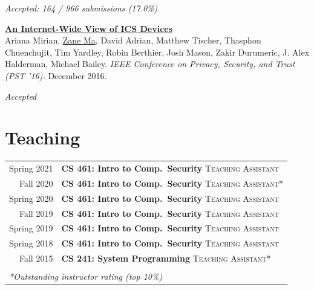 \documentclass[10pt,singlecolumn]{article} %
\begin{document}
{\raggedleft\textit{Accepted: 164 / 966 submissions (17.0\%)}\par}
\vspace{6pt}


\textbf{\href{https://zanema.com/papers/pst16_ics.pdf}{An Internet-Wide View of ICS Devices}}\\
Ariana Mirian, \underline{Zane Ma}, David Adrian, Matthew Tischer, Thasphon Chuenchujit, Tim Yardley, Robin Berthier, Josh Mason, Zakir Durumeric, J. Alex Halderman, Michael Bailey.
\textit{IEEE Conference on Privacy, Security, and Trust (PST '16).} December 2016. 

{\raggedleft\textit{Accepted}\par}
\vspace{6pt}




\section{Teaching} 

\begin{tabular}{rl}
Spring 2021    & \textbf{CS 461: Intro to Comp.\ Security} \textsc{Teaching Assistant}\\ 
Fall 2020    & \textbf{CS 461: Intro to Comp.\ Security} \textsc{Teaching Assistant*}\\ 
Spring 2020	 & \textbf{CS 461: Intro to Comp.\ Security} \textsc{Teaching Assistant}\\ 
Fall 2019	 & \textbf{CS 461: Intro to Comp.\ Security} \textsc{Teaching Assistant}\\
Spring 2019	 & \textbf{CS 461: Intro to Comp.\ Security} \textsc{Teaching Assistant}\\  
Spring 2018	 & \textbf{CS 461: Intro to Comp.\ Security} \textsc{Teaching Assistant}\\ 
Fall 2015	 & \textbf{CS 241: System Programming} \textsc{Teaching Assistant*}\\ \\
\multicolumn{2}{l}{\textit{*Outstanding instructor rating (top 10\%)}}
\end{tabular}\\[10pt]
\end{document}
